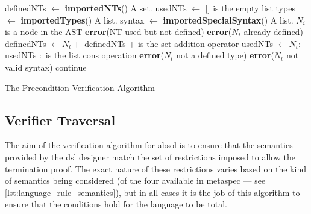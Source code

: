 \begin{algorithm}
\begin{algorithmic}
\State
\State definedNTs $\gets$ \textbf{importedNTs}()
\Comment A set.
\State usedNTs $\gets$ []
\Comment [] is the empty list
\State types $\gets$ \textbf{importedTypes}()
\Comment A list.
\State syntax $\gets$ \textbf{importedSpecialSyntax}()
\Comment A list.
\State
{}
\Comment $N_i$ is a node in the AST
    \State {}
\EndFor
\State
{}
        \State \textbf{error}(NT used but not defined)
    \EndIf
\EndFor
\State
{}
                \State \textbf{error}($N_t$ already defined)
            \Else
                \State definedNTs $\gets N_t +$ definedNTs
                \Comment $+$ is the set addition operator
            \EndIf
        \Else
            \State usedNTs $\gets N_t : $ usedNTs
            \Comment $:$ is the list cons operation
        \EndIf
        \State \textbf{error}($N_t$ not a defined type)
        \State \textbf{error}($N_t$ not valid syntax)
    \Else
        \State continue
    \EndIf
\EndFunction
\end{algorithmic}
\caption{The Precondition Verification Algorithm}
\label{alg:the_precondition_verification_algorithm}
\end{algorithm}



\subsection{Verifier Traversal} %
\label{sub:verifier_traversal}

The aim of the verification algorithm for \gls{absol} is to ensure that the semantics provided by the \gls{dsl} designer match the set of restrictions imposed to allow the termination proof. 
The exact nature of these restrictions varies based on the kind of semantics being considered (of the four available in \gls{metaspec} --- see \autoref{lst:language_rule_semantics}), but in all cases it is the job of this algorithm to ensure that the conditions hold for the language to be total. \\

